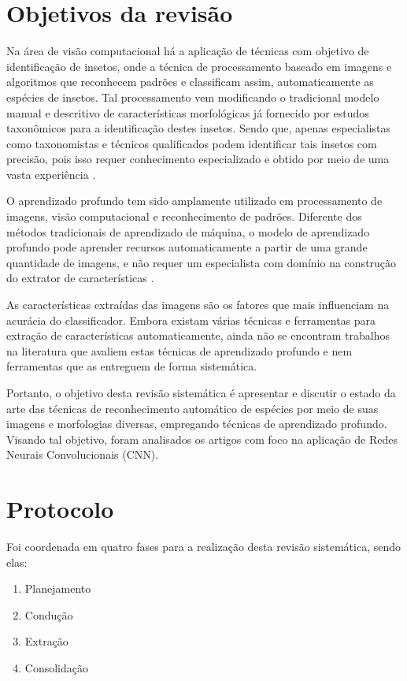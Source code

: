 \documentclass[
	12pt,				%
	oneside,			%
	a4paper,			%
	english,			%
	brazil				%
	]{abntex2ppgsi}
\begin{document}
\section{Objetivos da revisão}
Na área de visão computacional há a aplicação de técnicas com objetivo de identificação de insetos, onde a técnica de processamento baseado em imagens e algoritmos que reconhecem padrões e classificam assim, automaticamente as espécies de insetos. Tal processamento vem modificando o tradicional modelo manual e descritivo de características morfológicas já fornecido por estudos taxonômicos para a identificação destes insetos. Sendo que, apenas especialistas como taxonomistas e técnicos qualificados podem identificar tais insetos com precisão, pois isso requer conhecimento especializado e obtido por meio de uma vasta experiência \cite{lim2017performance}.

O aprendizado profundo tem sido amplamente utilizado em processamento de imagens, visão computacional e reconhecimento de padrões. Diferente dos métodos tradicionais de aprendizado de máquina, o modelo de aprendizado profundo pode aprender recursos automaticamente a partir de uma grande quantidade de imagens, e não requer um especialista com domínio na construção do extrator de características \cite{liu2020classification}.

As características extraídas das imagens são os fatores que mais influenciam na acurácia do classificador. Embora existam várias técnicas e ferramentas para extração de características automaticamente, ainda não se encontram trabalhos na literatura que avaliem estas técnicas de aprendizado profundo e nem ferramentas que as entreguem de forma sistemática.

Portanto, o objetivo desta revisão sistemática é apresentar e discutir o estado da arte das técnicas de reconhecimento automático de espécies por meio de suas imagens e morfologias diversas, empregando técnicas de aprendizado profundo. Visando tal objetivo, foram analisados os artigos com foco na aplicação de Redes Neurais Convolucionais (CNN).

\section{Protocolo}

Foi coordenada em quatro fases para a realização desta revisão sistemática, sendo elas:

\begin{enumerate}
  \item Planejamento
  \item Condução
  \item Extração
  \item Consolidação
\end{enumerate}
\end{document}
